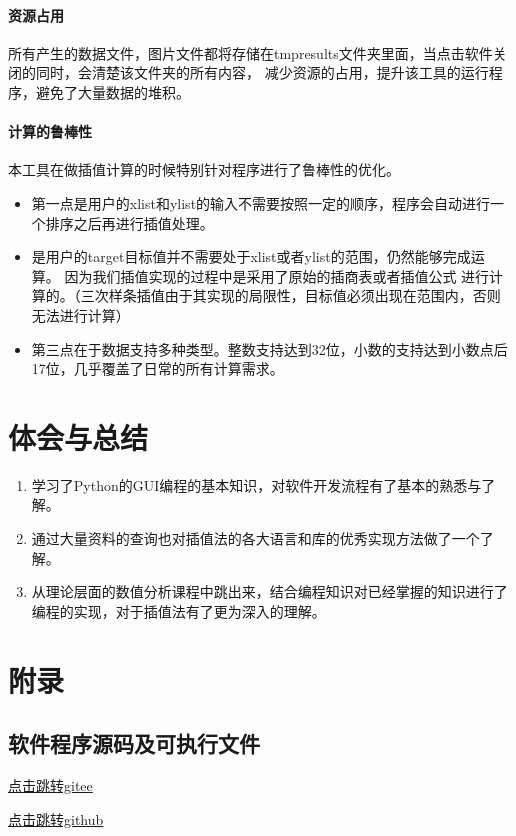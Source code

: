 \documentclass[UTF8]{ctexart}
\begin{document}
        \paragraph{资源占用} 所有产生的数据文件，图片文件都将存储在tmpresults文件夹里面，当点击软件关闭的同时，会清楚该文件夹的所有内容，
        减少资源的占用，提升该工具的运行程序，避免了大量数据的堆积。
        \paragraph{计算的鲁棒性} 本工具在做插值计算的时候特别针对程序进行了鲁棒性的优化。
            \begin{itemize}
                \item 第一点是用户的xlist和ylist的输入不需要按照一定的顺序，程序会自动进行一个排序之后再进行插值处理。
                \item 是用户的target目标值并不需要处于xlist或者ylist的范围，仍然能够完成运算。
                        因为我们插值实现的过程中是采用了原始的插商表或者插值公式
                        进行计算的。（三次样条插值由于其实现的局限性，目标值必须出现在范围内，否则无法进行计算）
                \item 第三点在于数据支持多种类型。整数支持达到32位，小数的支持达到小数点后17位，几乎覆盖了日常的所有计算需求。
            \end{itemize}
    \section{体会与总结}
        \begin{enumerate}
            \item 学习了Python的GUI编程的基本知识，对软件开发流程有了基本的熟悉与了解。
            \item 通过大量资料的查询也对插值法的各大语言和库的优秀实现方法做了一个了解。
            \item 从理论层面的数值分析课程中跳出来，结合编程知识对已经掌握的知识进行了编程的实现，对于插值法有了更为深入的理解。
            
        \end{enumerate}
    \section{附录}
        \subsection{软件程序源码及可执行文件}
        \href{https://gitee.com/hxh_create/numerical-analysis-operation}{点击跳转gitee}
        
        \href{https://github.com/hxhcreate/numerical-analysis-work/tree/master}{点击跳转github}
    
\end{document}
